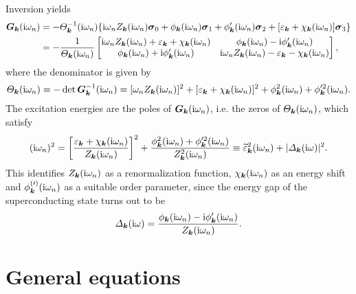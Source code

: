%
Inversion yields
%
\begin{align*}
    \boldsymbol G_{\boldsymbol k}(\mathrm i \omega_n) &= -\varTheta_{\boldsymbol k}^{-1}(\mathrm i \omega_n) \{
        \mathrm i \omega_n Z_{\boldsymbol k}(\mathrm i \omega_n) \boldsymbol \sigma_0
        + \phi _{\boldsymbol k}(\mathrm i \omega_n) \boldsymbol \sigma_1
        + \phi'_{\boldsymbol k}(\mathrm i \omega_n) \boldsymbol \sigma_2
        + [\varepsilon_{\boldsymbol k} + \chi_{\boldsymbol k}(\mathrm i \omega_n)] \boldsymbol \sigma_3 \}
    \\
    &= -\frac 1 {\varTheta_{\boldsymbol k}(\mathrm i \omega_n)}
    \begin{bmatrix}
        \mathrm i \omega_n Z_{\boldsymbol k}(\mathrm i \omega_n)
        + \varepsilon_{\boldsymbol k} + \chi_{\boldsymbol k}(\mathrm i \omega_n) &
        \phi_{\boldsymbol k}(\mathrm i \omega_n) - \mathrm i \phi'_{\boldsymbol k}(\mathrm i \omega_n) \\
        \phi_{\boldsymbol k}(\mathrm i \omega_n) + \mathrm i \phi'_{\boldsymbol k}(\mathrm i \omega_n) &
        \mathrm i \omega_n Z_{\boldsymbol k}(\mathrm i \omega_n)
        - \varepsilon_{\boldsymbol k} - \chi_{\boldsymbol k}(\mathrm i \omega_n)
    \end{bmatrix},
\end{align*}
%
where the denominator is given by
%
\begin{equation*}
    \varTheta_{\boldsymbol k}(\mathrm i \omega_n) = -\det \boldsymbol G_{\boldsymbol k}^{-1}(\mathrm i \omega_n)
    = [\omega_n Z_{\boldsymbol k}(\mathrm i \omega_n)]^2
    + [\varepsilon_{\boldsymbol k} + \chi_{\boldsymbol k}(\mathrm i \omega_n)]^2
    + \phi ^2_{\boldsymbol k}(\mathrm i \omega_n)
    + \phi'^2_{\boldsymbol k}(\mathrm i \omega_n).
\end{equation*}
%
The excitation energies are the poles of $\boldsymbol G_{\boldsymbol k}(\mathrm i \omega_n)$, i.e.
the zeros of $\varTheta_{\boldsymbol k}(\mathrm i \omega_n)$, which satisfy
%
\begin{align*}
    (\mathrm i \omega_n)^2 = \left[ \frac
        {\varepsilon_{\boldsymbol k} + \chi_{\boldsymbol k}(\mathrm i \omega_n)}
        {Z_{\boldsymbol k}(\mathrm i \omega_n)}
    \right]^2
    + \frac
        {\phi_{\boldsymbol k}^2(\mathrm i \omega_n) + \phi'^2_{\boldsymbol k}(\mathrm i \omega_n)}
        {Z_{\boldsymbol k}^2(\mathrm i \omega_n)}
    \equiv \widetilde {\varepsilon}^2_{\boldsymbol k}(\mathrm i \omega_n)
    + |\varDelta_{\boldsymbol k}(\mathrm i \omega)|^2.
\end{align*}
%
This identifies $Z_{\boldsymbol k}(\mathrm i \omega_n)$ as a renormalization function,
$\chi_{\boldsymbol k}(\mathrm i \omega_n)$ as an energy shift and $\phi^{(\prime)}_{\boldsymbol k}(\mathrm i
\omega_n)$ as a suitable order parameter, since the energy gap of the
superconducting state turns out to be
%
\begin{align*}
    \varDelta_{\boldsymbol k}(\mathrm i \omega) = \frac
        {\phi_{\boldsymbol k}(\mathrm i \omega_n) - \mathrm i \phi'_{\boldsymbol k}(\mathrm i \omega_n)}
        {Z_{\boldsymbol k}(\mathrm i \omega_n)}.
\end{align*}

\section{General equations}

